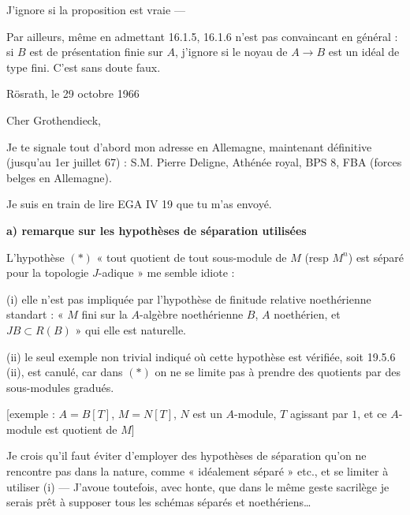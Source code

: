 \documentclass[11pt,a4paper]{article}
\begin{document}
J'ignore si la proposition est vraie ---


Par ailleurs, même en admettant 16.1.5, 16.1.6 n'est pas convaincant en
général : si $B$ est de présentation finie sur $A$, j'ignore si le noyau de
$A \to B$ est un idéal de type fini. C'est sans doute faux.


Rösrath, le 29 octobre 1966

Cher Grothendieck,

Je te signale tout d'abord mon adresse en Allemagne, maintenant définitive
(jusqu'au 1er juillet 67) : S.M. Pierre Deligne, Athénée
royal, BPS 8, FBA (forces belges en Allemagne).

Je suis en train de lire EGA IV 19 que tu m'as envoyé.

\textbf{a) remarque sur les hypothèses de séparation utilisées}

L'hypothèse $(*)$ « tout quotient de tout sous-module de $M$
\struck{\ill{}} (resp $M^n$) est séparé pour la topologie $J$-adique » me
semble idiote :

(i) elle  n'est pas impliquée par l'hypothèse de
finitude relative noethérienne standart : « $M$ fini sur la $A$-algèbre
noethérienne $B$, $A$ noethérien, et $JB \subset R(B)$ » qui elle est
naturelle.

(ii) le seul exemple non trivial indiqué où cette hypothèse est vérifiée,
soit 19.5.6 (ii), est canulé, car \struck{\ill{}} dans $(*)$ on ne se limite
pas à prendre des quotients par des sous-modules gradués.
\marginal{\ill{}}

[exemple : $A = B[T]$, $M = N[T]$, $N$ est un $A$-module, $T$ agissant par
$1$, et ce $A$-module est quotient de $M$]
\marginal{!}

Je crois qu'il faut éviter d'employer des hypothèses de séparation qu'on ne
rencontre pas dans la nature, comme « idéalement séparé » etc., et se
limiter à utiliser (i) --- J'avoue toutefois, avec honte, que dans le même
geste sacrilège je serais prêt à supposer tous les schémas séparés et
noethériens\ldots
\end{document}
